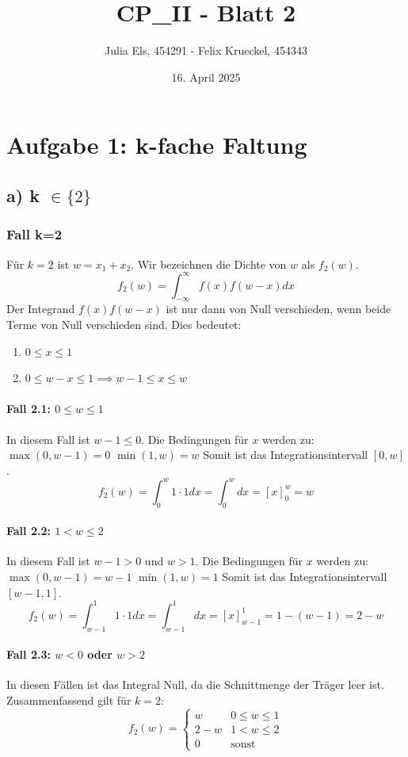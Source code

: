 \documentclass[11pt]{article}
\title{CP\_II - Blatt 2}
\author{Julia Els, 454291 - Felix Krueckel, 454343}
\date{16. April 2025}
\begin{document}
\maketitle

\section*{Aufgabe 1: k-fache Faltung}
\subsection*{a) k $\in \{2\}$}

\subsubsection*{Fall k=2}
Für $k=2$ ist $w = x_1 + x_2$. Wir bezeichnen die Dichte von $w$ als $f_{2}(w)$.
\begin{equation}
    f_{2}(w) = \int_{-\infty}^{\infty} f(x) f(w-x) dx
\end{equation}
Der Integrand $f(x)f(w-x)$ ist nur dann von Null verschieden, wenn beide Terme von Null verschieden sind. Dies bedeutet:
\begin{enumerate}
    \item $0 \le x \le 1$
    \item $0 \le w-x \le 1 \implies w-1 \le x \le w$
\end{enumerate}

\paragraph{Fall 2.1: $0 \le w \le 1$}
In diesem Fall ist $w-1 \le 0$. Die Bedingungen für $x$ werden zu:
$\max(0, w-1) = 0$
$\min(1, w) = w$
Somit ist das Integrationsintervall $[0, w]$.
\begin{equation}
    f_{2}(w) = \int_0^w 1 \cdot 1 dx = \int_0^w dx = [x]_0^w = w
\end{equation}

\paragraph{Fall 2.2: $1 < w \le 2$}
In diesem Fall ist $w-1 > 0$ und $w > 1$. Die Bedingungen für $x$ werden zu:
$\max(0, w-1) = w-1$
$\min(1, w) = 1$
Somit ist das Integrationsintervall $[w-1, 1]$.
\begin{equation}
    f_{2}(w) = \int_{w-1}^1 1 \cdot 1 dx = \int_{w-1}^1 dx = [x]_{w-1}^1 = 1 - (w-1) = 2-w
\end{equation}

\paragraph{Fall 2.3: $w < 0$ oder $w > 2$}
In diesen Fällen ist das Integral Null, da die Schnittmenge der Träger leer ist. \\


Zusammenfassend gilt für $k=2$:
\begin{equation}
    f_{2}(w) = \begin{cases} w & 0 \le w \le 1 \\ 2-w & 1 < w \le 2 \\ 0 & \text{sonst} \end{cases}
\end{equation}
\end{document}

